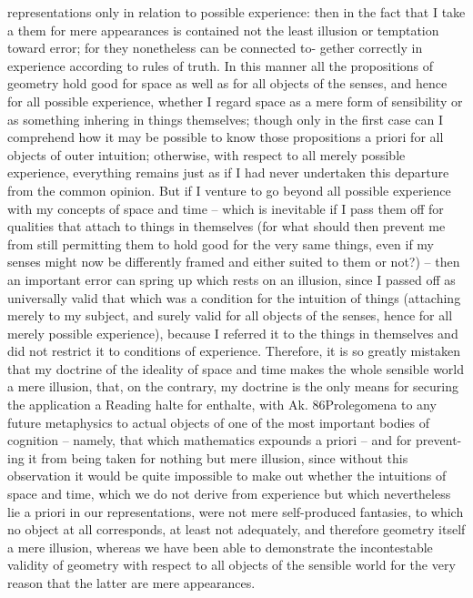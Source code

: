 representations only in relation to possible experience: then in the fact
that I take a them for mere appearances is contained not the least illusion
or temptation toward error; for they nonetheless can be connected to-
gether correctly in experience according to rules of truth. In this manner
all the propositions of geometry hold good for space as well as for all
objects of the senses, and hence for all possible experience, whether I
regard space as a mere form of sensibility or as something inhering in
things themselves; though only in the ﬁrst case can I comprehend how
it may be possible to know those propositions a priori for all objects of
outer intuition; otherwise, with respect to all merely possible experience,
everything remains just as if I had never undertaken this departure from
the common opinion.
But if I venture to go beyond all possible experience with my concepts
of space and time – which is inevitable if I pass them off for qualities that
attach to things in themselves (for what should then prevent me from
still permitting them to hold good for the very same things, even if my
senses might now be differently framed and either suited to them or
not?) – then an important error can spring up which rests on an illusion,
since I passed off as universally valid that which was a condition for the
intuition of things (attaching merely to my subject, and surely valid for all
objects of the senses, hence for all merely possible experience), because I
referred it to the things in themselves and did not restrict it to conditions
of experience.
Therefore, it is so greatly mistaken that my doctrine of the ideality of
space and time makes the whole sensible world a mere illusion, that, on
the contrary, my doctrine is the only means for securing the application
a
Reading halte for enthalte, with Ak.
86Prolegomena to any future metaphysics
to actual objects of one of the most important bodies of cognition –
namely, that which mathematics expounds a priori – and for prevent-
ing it from being taken for nothing but mere illusion, since without
this observation it would be quite impossible to make out whether the
intuitions of space and time, which we do not derive from experience
but which nevertheless lie a priori in our representations, were not mere
self-produced fantasies, to which no object at all corresponds, at least
not adequately, and therefore geometry itself a mere illusion, whereas
we have been able to demonstrate the incontestable validity of geometry
with respect to all objects of the sensible world for the very reason that
the latter are mere appearances.
